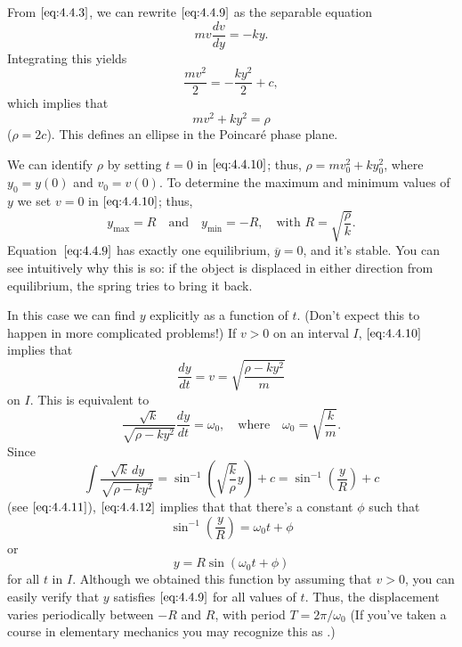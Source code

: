 \documentclass{ximera}
\begin{document}
\begin{example}
From $\eqref{eq:4.4.3}$, we can rewrite $\eqref{eq:4.4.9}$ as the separable
equation
$$
 mv\frac{dv}{dy}=-ky.
$$
Integrating this  yields
$$
\frac{mv^2}{2}=-\frac{ky^2}{2}+c,
$$
which implies that
\begin{equation}\label{eq:4.4.10}
mv^2+ky^2=\rho
\end{equation}
($\rho=2c$). This defines an ellipse in the Poincar\'e phase plane.

\begin{center}
\end{center}
 
 
 
We can identify $\rho$ by setting $t=0$ in $\eqref{eq:4.4.10}$;   thus,
$\rho=mv_0^2+ky_0^2$, where $y_0=y(0)$ and $v_0=v(0)$. To determine
the maximum and minimum values of $y$ we set $v=0$ in $\eqref{eq:4.4.10}$;
thus,
\begin{equation}\label{eq:4.4.11}
y_{\max}=R\quad\mbox{and}\quad
y_{\min}=-R,\quad\mbox{with } R=\sqrt{\frac{\rho}{k}}.
\end{equation}
Equation~$\eqref{eq:4.4.9}$ has exactly one equilibrium, $\overline{y}=0$,
and
it's stable. You can see intuitively why this is so: if the object is
displaced in either direction from  equilibrium, the spring tries
to bring it back.
 
In this case we can find $y$ explicitly as a function of $t$. (Don't
expect this to happen in more complicated problems!) If $v>0$ on an
interval $I$,  $\eqref{eq:4.4.10}$ implies that
$$
\frac{dy}{dt}=v=\sqrt{\frac{\rho-ky^2}{m}}
$$
on $I$. This is equivalent to
\begin{equation}\label{eq:4.4.12}
\frac{\sqrt{k}}{\sqrt{\rho-ky^2}}\frac{dy}{dt}=\omega_0,\quad\mbox{where}\quad
\omega_0=\sqrt{\frac{k}{m}}.
\end{equation}
Since
$$
\int\frac{\sqrt{k}\,dy}{\sqrt{\rho-ky^2}}=\sin^{-1}\left(\sqrt{\frac{k}{\rho}}y\right)+c=\sin^{-1}\left(\frac{y}{R}\right)+c
$$
(see $\eqref{eq:4.4.11}$), $\eqref{eq:4.4.12}$ implies that that there's a
constant $\phi$ such that
$$
\sin^{-1}\left(\frac{y}{R}\right)=\omega_0 t+\phi
$$
or
$$
y=R\sin(\omega_0 t+\phi)
$$
for all $t$ in $I$. Although we obtained this function by assuming that
$v>0$, you can easily verify that $y$ satisfies $\eqref{eq:4.4.9}$ for all
values of $t$. Thus, the displacement varies periodically between $-R$
and $R$, with period $T=2\pi/\omega_0$ (If
you've taken a course in elementary mechanics you may recognize this
as .)


\end{example}
\end{document}
